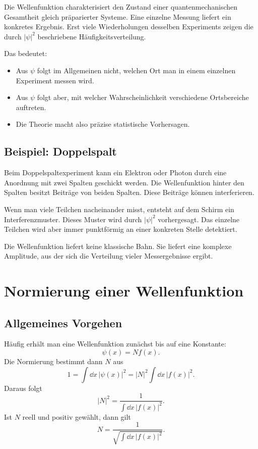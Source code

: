 \begin{conceptbox}
Die Wellenfunktion charakterisiert den Zustand einer quantenmechanischen Gesamtheit gleich präparierter Systeme. Eine einzelne Messung liefert ein konkretes Ergebnis. Erst viele Wiederholungen desselben Experiments zeigen die durch $|\psi|^2$ beschriebene Häufigkeitsverteilung.
\end{conceptbox}

Das bedeutet:
\begin{itemize}
    \item Aus $\psi$ folgt im Allgemeinen nicht, welchen Ort man in einem einzelnen Experiment messen wird.
    \item Aus $\psi$ folgt aber, mit welcher Wahrscheinlichkeit verschiedene Ortsbereiche auftreten.
    \item Die Theorie macht also präzise statistische Vorhersagen.
\end{itemize}

\subsection{Beispiel: Doppelspalt}

Beim Doppelspaltexperiment kann ein Elektron oder Photon durch eine Anordnung mit zwei Spalten geschickt werden. Die Wellenfunktion hinter den Spalten besitzt Beiträge von beiden Spalten. Diese Beiträge können interferieren.

Wenn man viele Teilchen nacheinander misst, entsteht auf dem Schirm ein Interferenzmuster. Dieses Muster wird durch $|\psi|^2$ vorhergesagt. Das einzelne Teilchen wird aber immer punktförmig an einer konkreten Stelle detektiert.

\begin{conceptbox}
Die Wellenfunktion liefert keine klassische Bahn. Sie liefert eine komplexe Amplitude, aus der sich die Verteilung vieler Messergebnisse ergibt.
\end{conceptbox}

\section{Normierung einer Wellenfunktion}

\subsection{Allgemeines Vorgehen}

Häufig erhält man eine Wellenfunktion zunächst bis auf eine Konstante:
\[
    \psi(x)=N f(x).
\]
Die Normierung bestimmt dann $N$ aus
\[
    1=\int\dd x\,|\psi(x)|^2
    =|N|^2\int\dd x\,|f(x)|^2.
\]
Daraus folgt
\[
    |N|^2=\frac{1}{\int\dd x\,|f(x)|^2}.
\]
Ist $N$ reell und positiv gewählt, dann gilt
\[
    N=\frac{1}{\sqrt{\int\dd x\,|f(x)|^2}}.
\]

